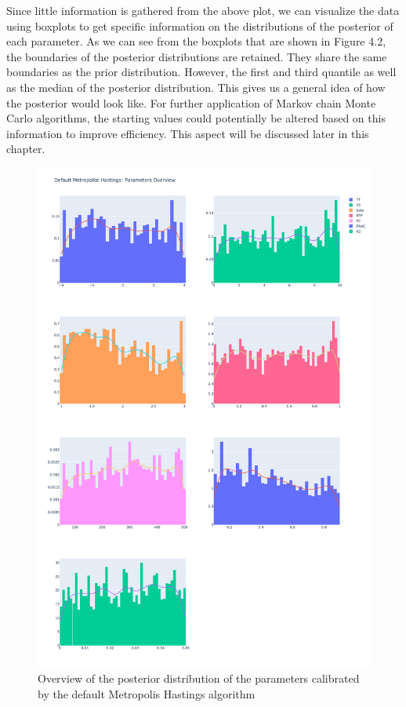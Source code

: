 Since little information is gathered from the above plot, we can visualize the data using boxplots to get specific information on the distributions of the posterior of each parameter. As we can see from the boxplots that are shown in Figure 4.2, the boundaries of the posterior distributions are retained. They share the same boundaries as the prior distribution. However, the first and third quantile as well as the median of the posterior distribution. This gives us a general idea of how the posterior would look like. For further application of Markov chain Monte Carlo algorithms, the starting values could potentially be altered based on this information to improve efficiency. This aspect will be discussed later in this chapter.


\begin{figure}
    \centering
    \includegraphics[width=1\textwidth]{figures/basic_mh/default_mh/default_mh_parameters_overview.png}
    \captionsetup{width=.8\textwidth}
    \caption{Overview of the posterior distribution of the parameters calibrated by the default Metropolis Hastings algorithm}
    \label{fig:enter-label}
\end{figure}



